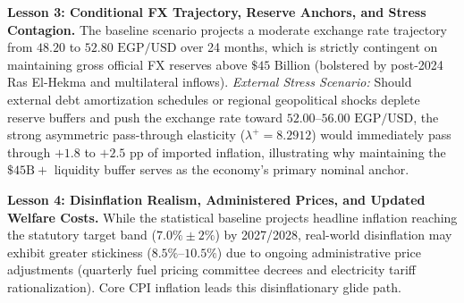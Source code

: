 \documentclass[review,12pt]{elsarticle}
\begin{document}
\textbf{Lesson 3: Conditional FX Trajectory, Reserve Anchors, and Stress Contagion.}
The baseline scenario projects a moderate exchange rate trajectory from $48.20$ to $52.80\text{ EGP/USD}$ over 24 months, which is strictly contingent on maintaining gross official FX reserves above $\$45\text{ Billion}$ (bolstered by post-2024 Ras El-Hekma and multilateral inflows). 
\textit{External Stress Scenario:} Should external debt amortization schedules or regional geopolitical shocks deplete reserve buffers and push the exchange rate toward $52.00$--$56.00\text{ EGP/USD}$, the strong asymmetric pass-through elasticity ($\lambda^{+} = 8.2912$) would immediately pass through $+1.8$ to $+2.5\text{ pp}$ of imported inflation, illustrating why maintaining the $\$45\text{B}+$ liquidity buffer serves as the economy's primary nominal anchor.

\textbf{Lesson 4: Disinflation Realism, Administered Prices, and Updated Welfare Costs.}
While the statistical baseline projects headline inflation reaching the statutory target band ($7.0\% \pm 2\%$) by 2027/2028, real-world disinflation may exhibit greater stickiness ($8.5\%$--$10.5\%$) due to ongoing administrative price adjustments (quarterly fuel pricing committee decrees and electricity tariff rationalization). Core CPI inflation leads this disinflationary glide path.
\end{document}
